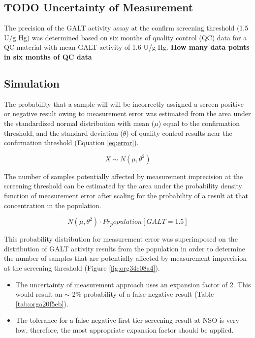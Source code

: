 \documentclass[review]{elsarticle}
\begin{document}
\subsection*{{\bfseries\sffamily TODO} Uncertainty of Measurement}
\label{sec:org9f09060}
The precision of the GALT activity assay at the confirm screening
threshold (1.5 U/g Hg) was determined based on six months of quality
control (QC) data for a QC material with mean GALT activity of 1.6 U/g Hg.
\textbf{How many data points in six months of QC data}

\subsection*{Simulation}
\label{sec:orgeb18b94}


The probability that a sample will will be incorrectly assigned a
screen positive or negative result owing to measurement error was
estimated from the area under the standardized normal distribution
with mean (\(\mu\)) equal to the confirmation threshold, and the standard
deviation (\(\theta\)) of quality control results near the confirmation
threshold (Equation \ref{eq:error}).

\begin{equation}\label{eq:error}
X \sim N(\mu, \theta^2)
\end{equation}

The number of samples potentially affected by measurement imprecision
at the screening threshold can be estimated by the area under the
probability density function of measurement error after scaling for
the probability of a result at that concentration in the population.

\begin{equation}\label{eq:scaled}
 N(\mu, \theta^2) \cdot Pr_population[GALT = 1.5] 
\end{equation}


This probability distribution for measurement error was superimposed
on the distribution of GALT activity results from the population in
order to determine the number of samples that are potentially affected
by measurement imprecision at the screening threshold (Figure
\ref{fig:org34c08a4}).


\begin{itemize}
\item The uncertainty of measurement approach uses an expansion factor
of 2. This would result an \(\sim\) 2\% probability of a false negative
result (Table \ref{tab:orga20f5eb}).
\item The tolerance for a false negative first tier screening result at
NSO is very low, therefore, the most appropriate expansion factor
should be applied.
\end{itemize}
\end{document}
